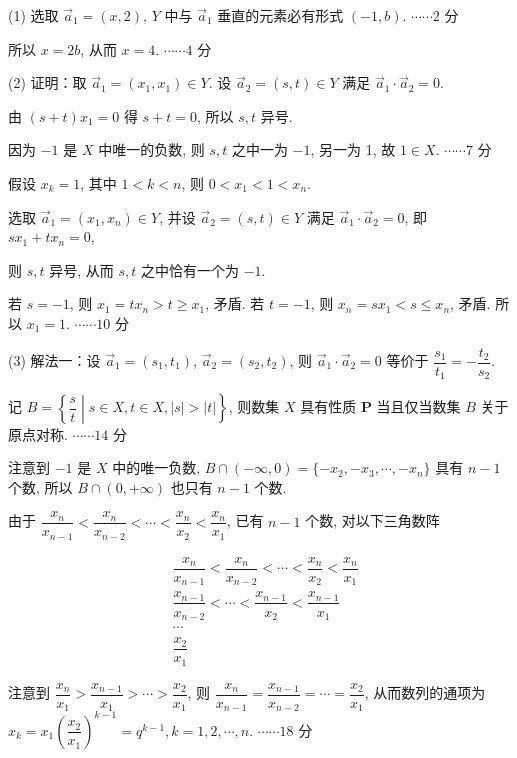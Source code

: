 \begin{solutions}
(1) 选取 $\vec{a}_1 = (x, 2)$, $Y$ 中与 $\vec{a}_1$ 垂直的元素必有形式 $(-1, b)$. \hfill $\cdots\cdots 2$ 分

所以 $x=2b$, 从而 $x=4$. \hfill $\cdots\cdots 4$ 分

(2) 证明：取 $\vec{a}_1 = (x_1, x_1) \in Y$. 设 $\vec{a}_2 = (s, t) \in Y$ 满足 $\vec{a}_1 \cdot \vec{a}_2 = 0$.

由 $(s+t)x_1 = 0$ 得 $s+t=0$, 所以 $s, t$ 异号.

因为 $-1$ 是 $X$ 中唯一的负数, 则 $s, t$ 之中一为 $-1$, 另一为 1, 故 $1 \in X$. \hfill $\cdots\cdots 7$ 分

假设 $x_k=1$, 其中 $1 < k < n$, 则 $0 < x_1 < 1 < x_n$.

选取 $\vec{a}_1 = (x_1, x_n) \in Y$, 并设 $\vec{a}_2 = (s, t) \in Y$ 满足 $\vec{a}_1 \cdot \vec{a}_2 = 0$, 即 $sx_1+tx_n=0$,

则 $s, t$ 异号, 从而 $s, t$ 之中恰有一个为 $-1$.

若 $s=-1$, 则 $x_1 = tx_n > t \ge x_1$, 矛盾. 若 $t=-1$, 则 $x_n = sx_1 < s \le x_n$, 矛盾. 所以 $x_1=1$. \hfill $\cdots\cdots 10$ 分

(3) 解法一：设 $\vec{a}_1 = (s_1, t_1)$, $\vec{a}_2 = (s_2, t_2)$, 则 $\vec{a}_1 \cdot \vec{a}_2 = 0$ 等价于 $\dfrac{s_1}{t_1} = - \dfrac{t_2}{s_2}$.

记 $B = \left\{ \dfrac{s}{t} \middle| s \in X, t \in X, |s| > |t| \right\}$, 则数集 $X$ 具有性质 \textbf{P} 当且仅当数集 $B$ 关于原点对称. \hfill $\cdots\cdots 14$ 分

注意到 $-1$ 是 $X$ 中的唯一负数, $B \cap (-\infty, 0) = \{-x_2, -x_3, \cdots, -x_n\}$ 具有 $n-1$ 个数, 所以 $B \cap (0, +\infty)$ 也只有 $n-1$ 个数.

由于 $\dfrac{x_n}{x_{n-1}} < \dfrac{x_n}{x_{n-2}} < \cdots < \dfrac{x_n}{x_2} < \dfrac{x_n}{x_1}$, 已有 $n-1$ 个数, 对以下三角数阵

\begin{align*}
&\dfrac{x_n}{x_{n-1}}  <  \dfrac{x_n}{x_{n-2}}  < \cdots <  \dfrac{x_n}{x_2}  <  \dfrac{x_n}{x_1} \\
& \dfrac{x_{n-1}}{x_{n-2}}  < \cdots <  \dfrac{x_{n-1}}{x_2}  <  \dfrac{x_{n-1}}{x_1} \\
& \cdots \\
& \dfrac{x_2}{x_1}  
\end{align*}


注意到 $\dfrac{x_n}{x_1} > \dfrac{x_{n-1}}{x_1} > \cdots > \dfrac{x_2}{x_1}$, 则 $\dfrac{x_n}{x_{n-1}} = \dfrac{x_{n-1}}{x_{n-2}} = \cdots = \dfrac{x_2}{x_1}$, 从而数列的通项为 $x_k = x_1 \left(\dfrac{x_2}{x_1}\right)^{k-1} = q^{k-1}, k=1, 2, \cdots, n$. \hfill $\cdots\cdots 18$ 分


\end{solutions}
